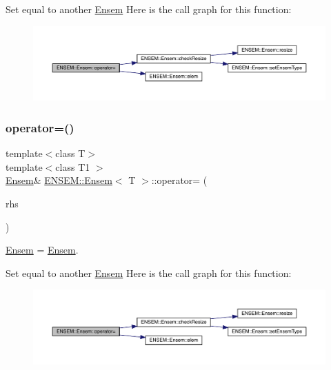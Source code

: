 Set equal to another \mbox{\hyperlink{classENSEM_1_1Ensem}{Ensem}} Here is the call graph for this function\+:
\nopagebreak
\begin{figure}[H]
\begin{center}
\leavevmode
\includegraphics[width=350pt]{d7/d3e/classENSEM_1_1Ensem_a83f34607867df5f1fb9ad887354de48d_cgraph}
\end{center}
\end{figure}
\mbox{\label{classENSEM_1_1Ensem_a83f34607867df5f1fb9ad887354de48d}} 
\subsubsection{\texorpdfstring{operator=()}{operator=()}\hspace{0.1cm}{\footnotesize\ttfamily [10/10]}}
{\footnotesize\ttfamily template$<$class T$>$ \\
template$<$class T1 $>$ \\
\mbox{\hyperlink{classENSEM_1_1Ensem}{Ensem}}\& \mbox{\hyperlink{classENSEM_1_1Ensem}{E\+N\+S\+E\+M\+::\+Ensem}}$<$ T $>$\+::operator= (\begin{DoxyParamCaption}\item[{const \mbox{\hyperlink{classENSEM_1_1Ensem}{Ensem}}$<$ T1 $>$ \&}]{rhs }\end{DoxyParamCaption})\hspace{0.3cm}{\ttfamily [inline]}}



\mbox{\hyperlink{classENSEM_1_1Ensem}{Ensem}} = \mbox{\hyperlink{classENSEM_1_1Ensem}{Ensem}}. 

Set equal to another \mbox{\hyperlink{classENSEM_1_1Ensem}{Ensem}} Here is the call graph for this function\+:
\nopagebreak
\begin{figure}[H]
\begin{center}
\leavevmode
\includegraphics[width=350pt]{d7/d3e/classENSEM_1_1Ensem_a83f34607867df5f1fb9ad887354de48d_cgraph}
\end{center}
\end{figure}
\mbox{\label{classENSEM_1_1Ensem_a9511b1d1b45de39920d451700eecd4d9}} 
